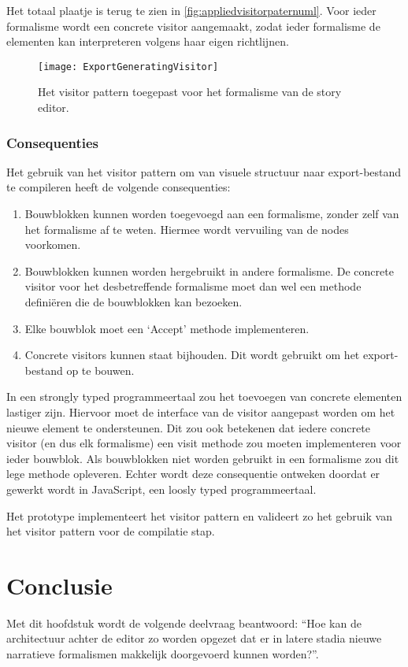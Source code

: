 Het totaal plaatje is terug te zien in \autoref{fig:appliedvisitorpaternuml}. Voor ieder formalisme wordt een concrete visitor aangemaakt, zodat ieder formalisme de elementen kan interpreteren volgens haar eigen richtlijnen.

\begin{figure}[htb]
    \centering    
    \texttt{[image: ExportGeneratingVisitor]}
    \caption{Het visitor pattern toegepast voor het formalisme van de story editor.}
    \label{fig:appliedvisitorpaternuml}
\end{figure}

\subsubsection{Consequenties}
Het gebruik van het visitor pattern om van visuele structuur naar export-bestand te compileren heeft de volgende consequenties:
\begin{enumerate}
    \item Bouwblokken kunnen worden toegevoegd aan een formalisme, zonder zelf van het formalisme af te weten. Hiermee wordt vervuiling van de nodes voorkomen. 
    \item Bouwblokken kunnen worden hergebruikt in andere formalisme. De concrete visitor voor het desbetreffende formalisme moet dan wel een methode definiëren die de bouwblokken kan bezoeken.
    \item Elke bouwblok moet een ‘Accept’ methode implementeren.
    \item Concrete visitors kunnen staat bijhouden. Dit wordt gebruikt om het export-bestand op te bouwen.
\end{enumerate}

In een strongly typed programmeertaal zou het toevoegen van concrete elementen lastiger zijn. Hiervoor moet de interface van de visitor aangepast worden om het nieuwe element te ondersteunen. Dit zou ook betekenen dat iedere concrete visitor (en dus elk formalisme) een visit methode zou moeten implementeren voor ieder bouwblok. Als bouwblokken niet worden gebruikt in een formalisme zou dit lege methode opleveren. Echter wordt deze consequentie ontweken doordat er gewerkt wordt in JavaScript, een loosly typed programmeertaal.

Het prototype implementeert het visitor pattern en valideert zo het gebruik van het visitor pattern voor de compilatie stap.

\section{Conclusie}
Met dit hoofdstuk wordt de volgende deelvraag beantwoord: “Hoe kan de architectuur achter de editor zo worden opgezet dat er in latere stadia nieuwe narratieve formalismen makkelijk doorgevoerd kunnen worden?”.

